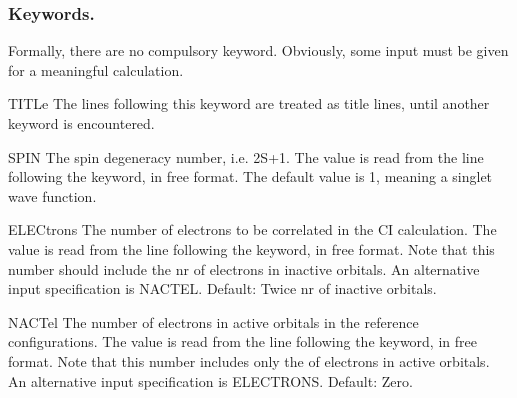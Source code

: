 \subsubsection{Keywords.}
Formally, there are no compulsory keyword. Obviously, some
input must be given for a meaningful calculation.
\begin{keywordlist}
\item[TITLe]
The lines following this keyword are treated as title lines, until
another keyword is encountered.
\item[SPIN]
The spin degeneracy number, i.e. 2S+1. The value is read from the
line following the keyword, in free format. The default value is
1, meaning a singlet wave function.
\item[ELECtrons]
The number of electrons to be correlated in the CI calculation.
The value is read from the line following the keyword, in free format.
Note that this number should include the nr of electrons in inactive
orbitals. An alternative input specification is NACTEL.
Default: Twice nr of inactive orbitals.
\item[NACTel]
The number of electrons in active orbitals in the reference configurations.
The value is read from the line following the keyword, in free format.
Note that this number includes only the of electrons in active
orbitals. An alternative input specification is ELECTRONS.
Default: Zero.

\end{keywordlist}
